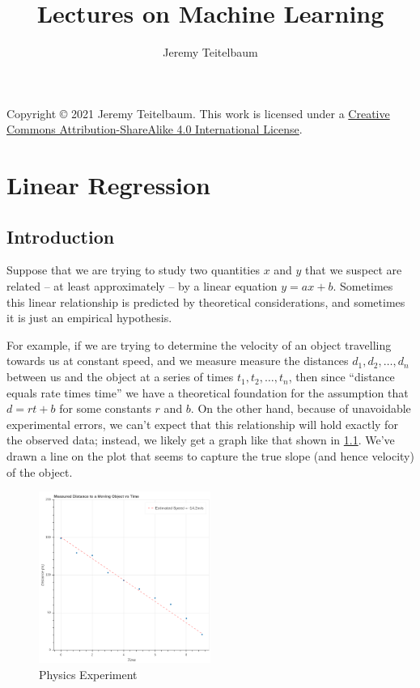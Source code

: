 \documentclass[
  oneside]{scrbook}
\title{Lectures on Machine Learning}
\author{Jeremy Teitelbaum}
\date{}
\begin{document}
\frontmatter
\maketitle

\strut\vfill

Copyright © 2021 Jeremy Teitelbaum. This work is licensed under a
\href{http://creativecommons.org/licenses/by-sa/4.0}{Creative Commons
Attribution-ShareAlike 4.0 International License}.

{
\hypersetup{linkcolor=}
\setcounter{tocdepth}{2}
\tableofcontents
}
\mainmatter
\hypertarget{linear-regression}{%
\chapter{Linear Regression}\label{linear-regression}}

\hypertarget{sec:Intro}{%
\section{Introduction}\label{sec:Intro}}

Suppose that we are trying to study two quantities \(x\) and \(y\) that
we suspect are related -- at least approximately -- by a linear equation
\(y=ax+b\). Sometimes this linear relationship is predicted by
theoretical considerations, and sometimes it is just an empirical
hypothesis.

For example, if we are trying to determine the velocity of an object
travelling towards us at constant speed, and we measure measure the
distances \(d_1, d_2, \ldots, d_n\) between us and the object at a
series of times \(t_1, t_2, \ldots, t_n\), then since ``distance equals
rate times time'' we have a theoretical foundation for the assumption
that \(d=rt+b\) for some constants \(r\) and \(b\). On the other hand,
because of unavoidable experimental errors, we can't expect that this
relationship will hold exactly for the observed data; instead, we likely
get a graph like that shown in \ref{fig:dvt}. We've drawn a line on the
plot that seems to capture the true slope (and hence velocity) of the
object.

\begin{figure}
\hypertarget{fig:dvt}{%
\centering
\includegraphics[width=0.5\textwidth,height=\textheight]{img/distance-vs-time.png}
\caption{Physics Experiment}\label{fig:dvt}
}
\end{figure}
\end{document}

